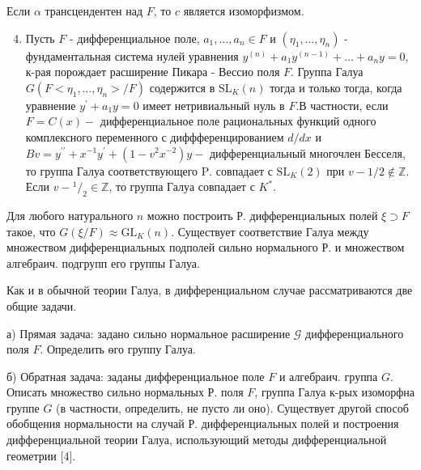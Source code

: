 \documentclass[10pt]{article}
\begin{document}
Если $\alpha$ трансцендентен над $F$, то $c$ является изоморфизмом.



\begin{enumerate}

  \setcounter{enumi}{3}

  \item Пусть $F$ - дифференциальное поле, $a_{1}, \ldots, a_{n} \in F$ и $\left(\eta_{1}, \ldots, \eta_{n}\right)$ - фундаментальная система нулей уравнения $y^{(n)}+a_{1} y^{(n-1)}+\ldots+a_{n} y=0$, к-рая порождает расширение Пикара - Вессио поля $F$. Группа Галуа $G\left(F<\eta_{1}, \ldots, \eta_{n}>/ F\right)$ содержится в $\mathrm{SL}_{K}(n)$ тогда и только тогда, когда уравнение $y^{\prime}+a_{1} y=0$ имеет нетривиальный нуль в $F$.В частности, если $F=C(x)-$ дифференциальное поле рациональных функций одного комплексного переменного с диффференцированием $d / d x$ и $B v=y^{\prime \prime}+x^{-1} y^{\prime}+\left(1-v^{2} x^{-2}\right) y-$ дифференциальный многочлен Бесселя, то группа Галуа соответствующего $\mathrm{P}$. совпадает с $\mathrm{SL}_{K}(2)$ при $v-1 / 2 \notin \mathbb{Z}$. Если $v-{ }^{1} /_{2} \in \mathbb{Z}$, то группа Галуа совпадает с $K^{*}$.

\end{enumerate}



Для любого натурального $n$ можно построить Р. дифференциальных полей $\xi \supset F$ такое, что $G(\xi / F) \approx \mathrm{GL}_{K}(n)$. Существует соответствие Галуа между множеством дифференциальных подполей сильно нормального Р. и множеством алгебраич. подгрупп его группы Галуа.



Как и в обычной теории Галуа, в дифференциальном случае рассматриваются две общие задачи.



а) Прямая задача: задано сильно нормальное расширение $\mathscr{G}$ дифференциального поля $F$. Определить өго группу Галуа.



б) Обратная задача: заданы дифференциальное поле $F$ и алгебраич. группа $G$. Описать множество сильно нормальных Р. поля $F$, группа Галуа к-рых изоморфна группе $G$ (в частности, определить, не пусто ли оно). Существует другой способ обобщения нормальности на случай Р. дифференциальных полей и построения дифференциальной теории Галуа, использующий методы дифференциальной геометрии [4].
\end{document}
